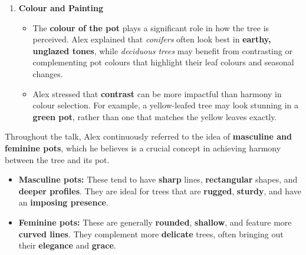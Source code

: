 \begin{enumerate}
\begin{itemize}
        \item The \textbf{lip}, or rim, of a pot significantly influences its character. A soft, curved lip lends a \textbf{feminine} feel, while a sharp, straight edge creates a more \textbf{masculine} impression. Furthermore, a lipless pot is generally better suited to trees displayed in a \emph{portrait style}, whereas a prominent lip tends to complement trees presented in a \emph{landscape style}.

        \item The \textbf{feet} of the pot are equally important. Raised feet often impart an air of sophistication, while a flatter, more practical foot is generally better suited to a more rugged tree.
    \end{itemize}

    \item \textbf{Colour and Painting}
    \begin{itemize}
        \item The \textbf{colour of the pot} plays a significant role in how the tree is perceived. Alex explained that \emph{conifers} often look best in \textbf{earthy, unglazed tones}, while \emph{deciduous trees} may benefit from contrasting or complementing pot colours that highlight their leaf colours and seasonal changes.

        \item Alex stressed that \textbf{contrast} can be more impactful than harmony in colour selection. For example, a yellow\--leafed tree may look stunning in a \textbf{green pot}, rather than one that matches the yellow leaves exactly.
    \end{itemize}
\end{enumerate}

\noindent
Throughout the talk, Alex continuously referred to the idea of \textbf{masculine and feminine pots}, which he believes is a crucial concept in achieving harmony between the tree and its pot.

\begin{itemize}
    \item \textbf{Masculine pots:} These tend to have \textbf{sharp} lines, \textbf{rectangular} shapes, and \textbf{deeper profiles}. They are ideal for trees that are \textbf{rugged}, \textbf{sturdy}, and have an \textbf{imposing presence}.

    \item \textbf{Feminine pots:} These are generally \textbf{rounded}, \textbf{shallow}, and feature more \textbf{curved lines}. They complement more \textbf{delicate} trees, often bringing out their \textbf{elegance} and \textbf{grace}.
\end{itemize}

